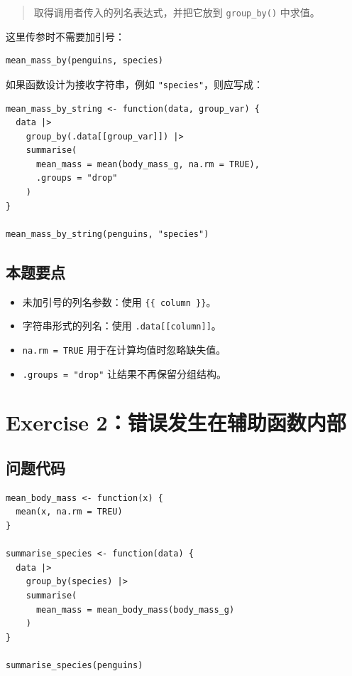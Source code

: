 \documentclass[11pt,a4paper]{ctexart}
\begin{document}
\begin{quote}
取得调用者传入的列名表达式，并把它放到 \lstinline|group_by()| 中求值。
\end{quote}

这里传参时不需要加引号：

\begin{lstlisting}[style=rcode]
mean_mass_by(penguins, species)
\end{lstlisting}

如果函数设计为接收字符串，例如 \lstinline|"species"|，则应写成：

\begin{lstlisting}[style=rcode]
mean_mass_by_string <- function(data, group_var) {
  data |>
    group_by(.data[[group_var]]) |>
    summarise(
      mean_mass = mean(body_mass_g, na.rm = TRUE),
      .groups = "drop"
    )
}

mean_mass_by_string(penguins, "species")
\end{lstlisting}

\subsection{本题要点}

\begin{itemize}
  \item 未加引号的列名参数：使用 \lstinline|{{ column }}|。
  \item 字符串形式的列名：使用 \lstinline|.data[[column]]|。
  \item \lstinline|na.rm = TRUE| 用于在计算均值时忽略缺失值。
  \item \lstinline|.groups = "drop"| 让结果不再保留分组结构。
\end{itemize}

\section{Exercise 2：错误发生在辅助函数内部}

\subsection{问题代码}

\begin{lstlisting}[style=rcode]
mean_body_mass <- function(x) {
  mean(x, na.rm = TREU)
}

summarise_species <- function(data) {
  data |>
    group_by(species) |>
    summarise(
      mean_mass = mean_body_mass(body_mass_g)
    )
}

summarise_species(penguins)
\end{lstlisting}
\end{document}
